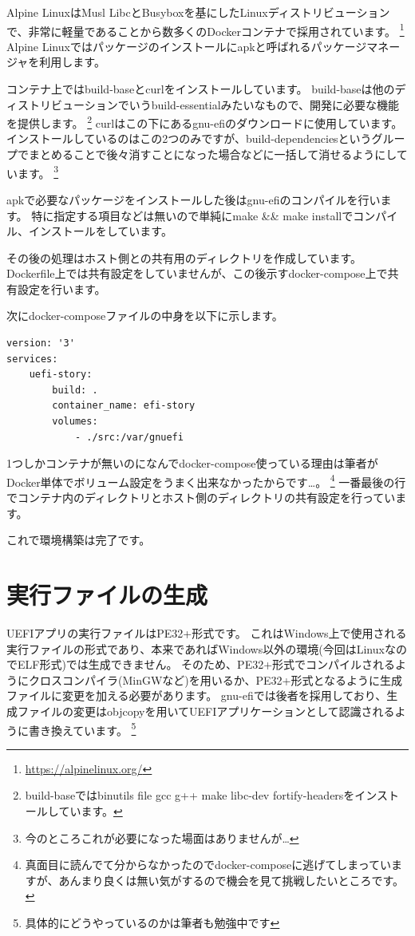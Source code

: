 \documentclass[10pt,b5paper,twoside,openany]{ltjsbook}
\begin{document}
Alpine LinuxはMusl LibcとBusyboxを基にしたLinuxディストリビューションで、非常に軽量であることから数多くのDockerコンテナで採用されています。
\footnote{\url{https://alpinelinux.org/}}
Alpine Linuxではパッケージのインストールにapkと呼ばれるパッケージマネージャを利用します。

コンテナ上ではbuild-baseとcurlをインストールしています。
build-baseは他のディストリビューションでいうbuild-essentialみたいなもので、開発に必要な機能を提供します。
\footnote{build-baseではbinutils file gcc g++ make libc-dev fortify-headersをインストールしています。}
curlはこの下にあるgnu-efiのダウンロードに使用しています。
インストールしているのはこの2つのみですが、build-dependenciesというグループでまとめることで後々消すことになった場合などに一括して消せるようにしています。
\footnote{今のところこれが必要になった場面はありませんが…}

apkで必要なパッケージをインストールした後はgnu-efiのコンパイルを行います。
特に指定する項目などは無いので単純にmake \&\& make installでコンパイル、インストールをしています。

その後の処理はホスト側との共有用のディレクトリを作成しています。
Dockerfile上では共有設定をしていませんが、この後示すdocker-compose上で共有設定を行います。

次にdocker-composeファイルの中身を以下に示します。
\begin{lstlisting}[style=customBash,caption=docker-compose,label=prog:docker-compose]
version: '3'
services:
    uefi-story:
        build: .
        container_name: efi-story
        volumes:
            - ./src:/var/gnuefi
\end{lstlisting}
1つしかコンテナが無いのになんでdocker-compose使っている理由は筆者がDocker単体でボリューム設定をうまく出来なかったからです…。
\footnote{真面目に読んでて分からなかったのでdocker-composeに逃げてしまっていますが、あんまり良くは無い気がするので機会を見て挑戦したいところです。}    
一番最後の行でコンテナ内のディレクトリとホスト側のディレクトリの共有設定を行っています。

これで環境構築は完了です。

\section{実行ファイルの生成}
UEFIアプリの実行ファイルはPE32+形式です。
これはWindows上で使用される実行ファイルの形式であり、本来であればWindows以外の環境(今回はLinuxなのでELF形式)では生成できません。
そのため、PE32+形式でコンパイルされるようにクロスコンパイラ(MinGWなど)を用いるか、PE32+形式となるように生成ファイルに変更を加える必要があります。
gnu-efiでは後者を採用しており、生成ファイルの変更はobjcopyを用いてUEFIアプリケーションとして認識されるように書き換えています。
\footnote{具体的にどうやっているのかは筆者も勉強中です}
\end{document}
